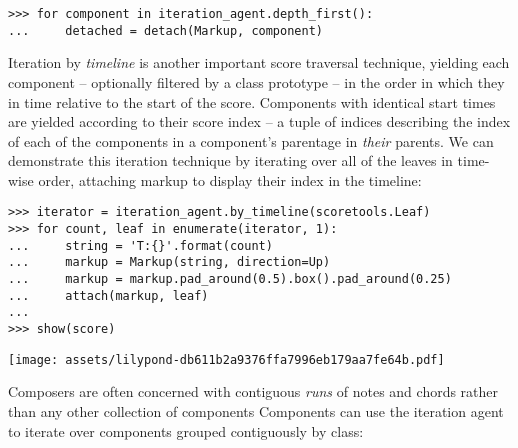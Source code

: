 \begin{abjadbookoutput}
\begin{singlespacing}
\vspace{-0.5\baselineskip}
\begin{verbatim}
>>> for component in iteration_agent.depth_first():
...     detached = detach(Markup, component)
\end{verbatim}
\end{singlespacing}
\end{abjadbookoutput}

\noindent Iteration by \emph{timeline} is another important score traversal
technique, yielding each component -- optionally filtered by a class prototype
-- in the order in which they in time relative to the start of the score.
Components with identical start times are yielded according to their score
index -- a tuple of indices describing the index of each of the components in a
component's parentage in \emph{their} parents. We can demonstrate this
iteration technique by iterating over all of the leaves in time-wise order,
attaching markup to display their index in the timeline:

\begin{comment}
<abjad>
iterator = iteration_agent.by_timeline(scoretools.Leaf)
for count, leaf in enumerate(iterator, 1):
    string = 'T:{}'.format(count)
    markup = Markup(string, direction=Up)
    markup = markup.pad_around(0.5).box().pad_around(0.25)
    attach(markup, leaf)

show(score)
</abjad>
\end{comment}

\begin{abjadbookoutput}
\begin{singlespacing}
\vspace{-0.5\baselineskip}
\begin{verbatim}
>>> iterator = iteration_agent.by_timeline(scoretools.Leaf)
>>> for count, leaf in enumerate(iterator, 1):
...     string = 'T:{}'.format(count)
...     markup = Markup(string, direction=Up)
...     markup = markup.pad_around(0.5).box().pad_around(0.25)
...     attach(markup, leaf)
...
>>> show(score)
\end{verbatim}
\noindent\texttt{[image: assets/lilypond-db611b2a9376ffa7996eb179aa7fe64b.pdf]}
\end{singlespacing}
\end{abjadbookoutput}

\noindent Composers are often concerned with contiguous \emph{runs} of notes
and chords rather than any other collection of components Components can use
the iteration agent to iterate over components grouped contiguously by class:

